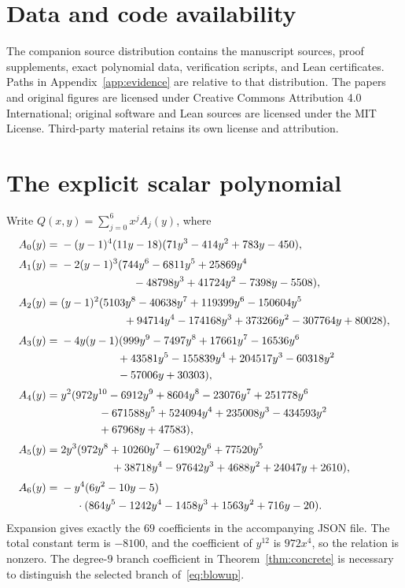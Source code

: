 \documentclass[11pt]{article}
\theoremstyle{definition}\newtheorem{definition}[theorem]{Definition}
\theoremstyle{remark}\newtheorem{remark}[theorem]{Remark}
\begin{document}
\section*{Data and code availability}
The companion source distribution contains the manuscript sources, proof supplements, exact polynomial data, verification scripts, and Lean certificates. Paths in Appendix~\ref{app:evidence} are relative to that distribution. The papers and original figures are licensed under Creative Commons Attribution 4.0 International; original software and Lean sources are licensed under the MIT License. Third-party material retains its own license and attribution.

\appendix
\section{The explicit scalar polynomial}\label{app:Q}
Write $Q(x,y)=\sum_{j=0}^6x^jA_j(y)$, where
\begin{align*}
A_0(y)={}&-(y-1)^4(11y-18)(71y^3-414y^2+783y-450),\\[2pt]
A_1(y)={}&-2(y-1)^3(744y^6-6811y^5+25869y^4\\
 &\hspace{23mm}-48798y^3+41724y^2-7398y-5508),\\[2pt]
A_2(y)={}&(y-1)^2(5103y^8-40638y^7+119399y^6-150604y^5\\
 &\hspace{20mm}+94714y^4-174168y^3+373266y^2-307764y+80028),\\[2pt]
A_3(y)={}&-4y(y-1)(999y^9-7497y^8+17661y^7-16536y^6\\
 &\hspace{18mm}+43581y^5-155839y^4+204517y^3-60318y^2\\
 &\hspace{18mm}-57006y+30303),\\[2pt]
A_4(y)={}&y^2(972y^{10}-6912y^9+8604y^8-23076y^7+251778y^6\\
 &\hspace{12mm}-671588y^5+524094y^4+235008y^3-434593y^2\\
 &\hspace{12mm}+67968y+47583),\\[2pt]
A_5(y)={}&2y^3(972y^8+10260y^7-61902y^6+77520y^5\\
 &\hspace{16mm}+38718y^4-97642y^3+4688y^2+24047y+2610),\\[2pt]
A_6(y)={}&-y^4(6y^2-10y-5)\\
 &\hspace{5mm}\cdot(864y^5-1242y^4-1458y^3+1563y^2+716y-20).
\end{align*}
Expansion gives exactly the $69$ coefficients in the accompanying JSON file. The total constant term is $-8100$, and the coefficient of $y^{12}$ is $972x^4$, so the relation is nonzero. The degree-$9$ branch coefficient in Theorem~\ref{thm:concrete} is necessary to distinguish the selected branch of~\eqref{eq:blowup}.
\end{document}
